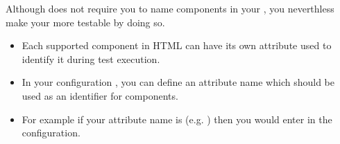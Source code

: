 
Although \app{} does not require you to name components in your \gdaut{}, you neverthless make your \gdaut{} more testable by doing so.

\begin{itemize}
\item Each supported component in HTML \gdauts{} can have its own attribute used to identify it during test execution.
\item In your \gdaut{} configuration   , you can define an attribute name which should be used as an identifier for components. 
\item For example if your attribute name is  (e.g. ) then you would enter  in the \gdaut{} configuration. 
\end{itemize}


 
